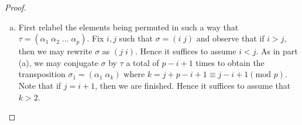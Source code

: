 \documentclass[10pt]{amsart}
\begin{document}
\begin{ex2}
\begin{proof}
\begin{enumerate}[(a)]
      It remains only to show that $\sigma$ and $\tau$ generate the transpositions of the form $\left(i\; i + j\right)$, where $1 \leq i \leq n$ and $1 < j \leq n - i$.
      These transpositions may be constructed in the following way.
      Let $i$ and $j$ be given.
      Consider the element $\tau_i = \left(i\; i+1\right)$ and observe that for all $1 < k \leq j$, $\tau_{i+k}(i) = i$.
      By associativity and the fact that transpositions are involutary, we may conjugate $\tau_i$ by the elements $\tau_{i+1}, \tau_{i+2}, \ldots, \tau_{i+j-1}$ in the following way:
      $$\tau_{i+j} \left( \ldots \left( \tau_{i+2} \left(\tau_{i+1} \tau_i\tau_{i+1} \right) \tau_{i+2}\right) \ldots \right) \tau_{i+j} = \left(i\; \tau_{i+j}\ldots\tau_{i+2}\tau_{i+1}\left(i + 1\right) \right).$$
      Now we observe that, by construction, $\tau_{i + k} = \left(i + k \;\; i+k+1\right)$ for $k = 1, \ldots, j$. 
      Hence $\tau_{i+j}\ldots\tau_{i+2}\tau_{i+1}\left(i + 1\right) = i+j$, thereby completing the construction.
      Therefore $S_n = \left<\left(1\; 2\right), \left(1\; 2\; 3\; \ldots\; n\right)\right>$. 
    \item
      First relabel the elements being permuted in such a way that $\tau = (\alpha_1\; \alpha_2\; \ldots\; \alpha_p)$.
      Fix $i,j$ such that $\sigma = (i\; j)$ and observe that if $i > j$, then we may rewrite $\sigma$ as $(j\; i)$.
      Hence it suffices to assume $i < j$.
      As in part (a), we may conjugate $\sigma$ by $\tau$ a total of $p - i + 1$ times to obtain the transposition $\sigma_1 = (\alpha_1\; \alpha_{k})$ where $k = j + p - i + 1 \equiv j - i + 1 (\text{mod } p)$.  Note that if $j = i+1$, then we are finished.  Hence it suffices to assume that $k > 2$.
      

\end{enumerate}
\end{proof}
\end{ex2}
\end{document}
